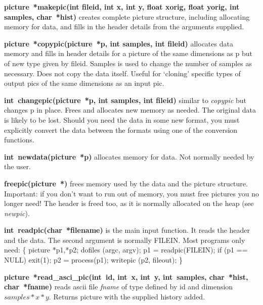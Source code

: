 \documentclass[11pt,twoside,english,a4paper]{article}
\begin{document}
\textbf{picture~{*}makepic(int fileid, int x, int y, float xorig, float yorig, int samples, char~{*hist})}
creates complete picture structure, including allocating memory for data,
and fills in the header details from the arguments supplied.

\textbf{picture~{*}copypic(picture~{*p}, int samples, int fileid)} allocates data memory
and fills in header details for a picture of the same dimensions as p
but of new type given by fileid. Samples is used to change the number of samples as necessary. 
Does not copy the data itself. 
Useful for `cloning' specific types of output pics of the same dimensions as an input pic.

\textbf{int~changepic(picture~{*p}, int samples, int fileid)} similar to \emph{copypic}
but changes p in place. Frees and allocates new memory as needed. The original
data is likely to be lost. Should you need the data in some new format,
you must explicitly convert the data between the formats using one of the conversion
functions. 

\textbf{int~newdata(picture~{*p})} allocates memory for data. Not
normally needed by the user. 

\textbf{freepic(picture~{*})} frees memory used by the data and
the picture structure. Important: if you don't want to run out of
memory, you must free pictures you no longer need! The header is freed
too, as it is normally allocated on the heap (see \emph{newpic}).

\textbf{int~readpic(char~{*filename})} is  the main 
input function. It reads the header and the data. 
The second argument is normally FILEIN. Most programs only
need: \{ picture {*}p1,{*}p2; dofiles (argc, argv); p1 = readpic(FILEIN); 
if (p1 == NULL) exit(1); p2 = process(p1); writepic (p2, fileout); \}

\textbf{picture~{*}read\_asci\_pic(int~id, int~x, int~y, int~samples, char~{*hist}, char~{*fname})} 
reads ascii file \emph{fname} of type defined by id and dimension $samples*x*y$. 
Returns picture with the supplied history added. 
\end{document}
